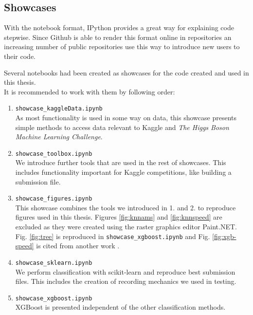 \subsection{Showcases}
With the notebook format, IPython provides a great way for explaining code stepwise. Since Github is able to render this format online in repositories an increasing number of public repositories use this way to introduce new users to their code.

Several notebooks had been created as showcases for the code created and used in this thesis.\\
It is recommended to work with them by following order:

\begin{enumerate}
	\item \texttt{showcase\_kaggleData.ipynb}\\
			As most functionality is used in some way on data, this showcase presents simple methods to access data relevant to Kaggle and \emph{The Higgs Boson Machine Learning Challenge}.
	\item \texttt{showcase\_toolbox.ipynb}\\
			We introduce further tools that are used in the rest of showcases. This includes functionality important for Kaggle competitions, like building a submission file.
	\item \texttt{showcase\_figures.ipynb}\\
			This showcase combines the tools we introduced in 1. and 2. to reproduce figures used in this thesis. Figures \ref{fig:knnams} and \ref{fig:knnspeed} are excluded as they were created using the raster graphics editor Paint.NET.\\Fig. \ref{fig:tree} is reproduced in \texttt{showcase\_xgboost.ipynb} and Fig. \ref{fig:xgb-speed} is cited from another work \cite{chen14}.
	\item \texttt{showcase\_sklearn.ipynb}\\
			We perform classification with scikit-learn and reproduce best submission files. This includes the creation of recording mechanics we used in testing.
	\item \texttt{showcase\_xgboost.ipynb}\\
			XGBoost is presented independent of the other classification methods.
\end{enumerate}